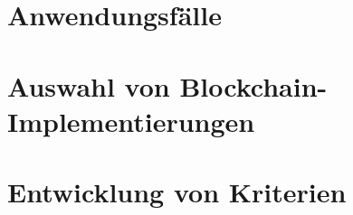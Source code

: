 







 \newpage
\cleardoublepage 


\tableofcontents
\cleardoublepage 








\newpage

\chapter{Anwendungsfälle}\label{chap:usecases}



\chapter{Auswahl von Blockchain-Implementierungen}\label{chap:implementations}



\chapter{Entwicklung von Kriterien}


  
